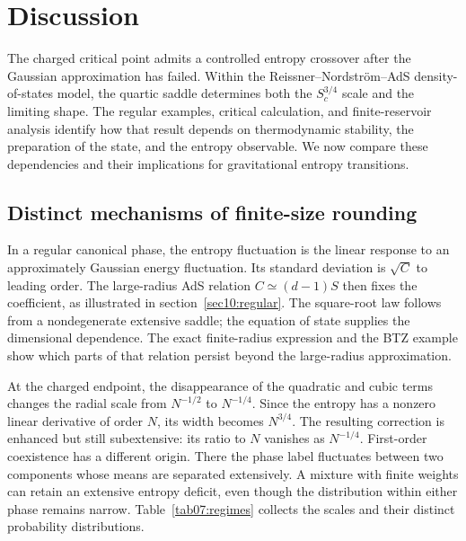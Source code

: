 \documentclass[11pt,letterpaper]{article}
\theoremstyle{plain}
\theoremstyle{definition}
\theoremstyle{remark}
\begin{document}
\section{Discussion}
\label{sec07:discussion}

The charged critical point admits a controlled entropy crossover after the Gaussian approximation has failed. Within the Reissner--Nordstr\"om--AdS density-of-states model, the quartic saddle determines both the $S_c^{3/4}$ scale and the limiting shape. The regular examples, critical calculation, and finite-reservoir analysis identify how that result depends on thermodynamic stability, the preparation of the state, and the entropy observable. We now compare these dependencies and their implications for gravitational entropy transitions.

\subsection{Distinct mechanisms of finite-size rounding}
\label{sec07:regimes}

In a regular canonical phase, the entropy fluctuation is the linear response to an approximately Gaussian energy fluctuation. Its standard deviation is $\sqrt C$ to leading order. The large-radius AdS relation $C\simeq(d-1)S$ then fixes the coefficient, as illustrated in section~\ref{sec10:regular}. The square-root law follows from a nondegenerate extensive saddle; the equation of state supplies the dimensional dependence. The exact finite-radius expression and the BTZ example show which parts of that relation persist beyond the large-radius approximation.

At the charged endpoint, the disappearance of the quadratic and cubic terms changes the radial scale from $N^{-1/2}$ to $N^{-1/4}$. Since the entropy has a nonzero linear derivative of order $N$, its width becomes $N^{3/4}$. The resulting correction is enhanced but still subextensive: its ratio to $N$ vanishes as $N^{-1/4}$. First-order coexistence has a different origin. There the phase label fluctuates between two components whose means are separated extensively. A mixture with finite weights can retain an extensive entropy deficit, even though the distribution within either phase remains narrow. Table~\ref{tab07:regimes} collects the scales and their distinct probability distributions.
\end{document}
